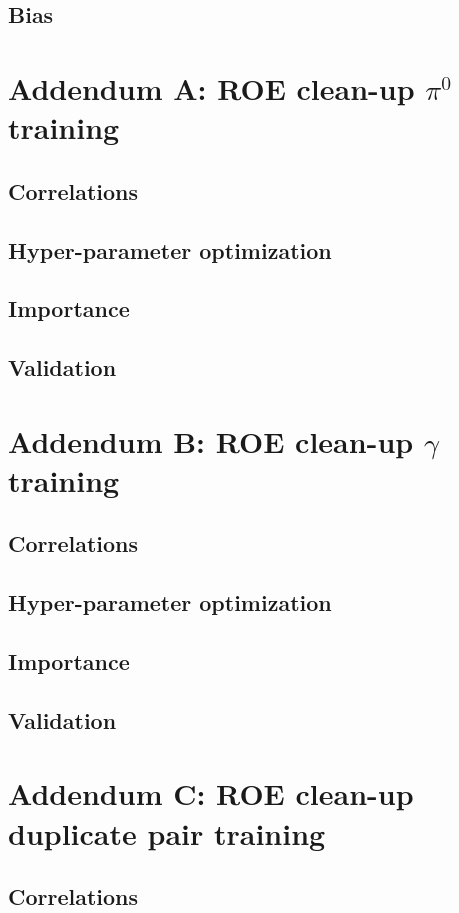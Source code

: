 \documentclass[  headings=standardclasses,
  headings=big,oneside,a4paper,openany,12pt]{scrbook}
\begin{document}
\section{Bias}

\chapter*{Addendum A: ROE clean-up $\pi^0$ training}
\section*{Correlations}
\section*{Hyper-parameter optimization}
\section*{Importance}
\section*{Validation}

\chapter*{Addendum B: ROE clean-up $\gamma$ training}
\section*{Correlations}
\section*{Hyper-parameter optimization}
\section*{Importance}
\section*{Validation}

\chapter*{Addendum C: ROE clean-up duplicate pair training}
\section*{Correlations}
\end{document}
